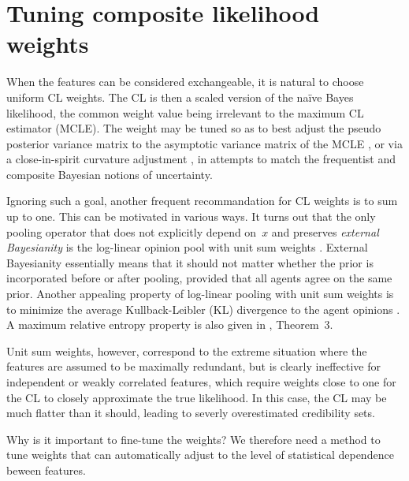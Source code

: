 \documentclass[english]{scrartcl}
\begin{document}
\section{Tuning composite likelihood weights}

When the features can be considered exchangeable, it is natural to choose uniform CL weights. The CL is then a scaled version of the na\"ive Bayes likelihood, the common weight value being irrelevant to the maximum CL estimator (MCLE). The weight may be tuned so as to best adjust the pseudo posterior variance matrix to the asymptotic variance matrix of the MCLE \cite{Pauli-11}, or via a close-in-spirit curvature adjustment \cite{Ribatet-12}, in attempts to match the frequentist and composite Bayesian notions of uncertainty.

Ignoring such a goal, another frequent recommandation for CL weights is to sum up to one. This can be motivated in various ways. It turns out that the only pooling operator that does not explicitly depend on~$x$ and preserves {\em external Bayesianity} is the log-linear opinion pool with unit sum weights \cite{Genest-86b}. External Bayesianity essentially means that it should not matter whether the prior is incorporated before or after pooling, provided that all agents agree on the same prior. Another appealing property of log-linear pooling with unit sum weights is to minimize the average Kullback-Leibler (KL) divergence to the agent opinions \cite{Garg-04}. A maximum relative entropy property is also given in \cite{Wang-14}, Theorem~3.

Unit sum weights, however, correspond to the extreme situation where the features are assumed to be maximally redundant, but is clearly ineffective for independent or weakly correlated features, which require weights close to one for the CL to closely approximate the true likelihood. In this case, the CL may be much flatter than it should, leading to severly overestimated credibility sets.

{\color{red} Why is it important to fine-tune the weights?}
We therefore need a method to tune weights that can automatically adjust to the level of statistical dependence beween features.

\end{document}

